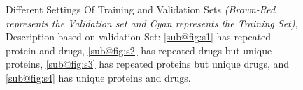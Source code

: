 \begin{figure}[tbp]
    \centering
     \qquad
     \qquad
     \qquad
    \caption[Different Settings Of Training and Validation Sets]{Different Settings Of Training and Validation Sets
       \textit{(Brown-Red represents the Validation set and Cyan represents the Training Set)}, Description based on validation Set: \ref{sub@fig:s1} has repeated protein and drugs, \ref{sub@fig:s2} has repeated drugs but unique proteins, \ref{sub@fig:s3} has repeated proteins but unique drugs, and \ref{sub@fig:s4} has unique proteins and drugs.
        }
    \label{fig:train_val}
\end{figure}

